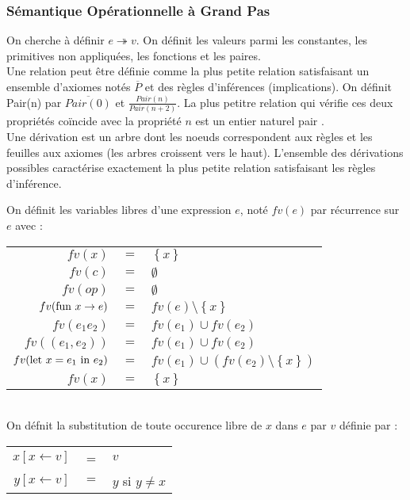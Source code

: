 \documentclass{cours}
\newcommand*{\fun}[2]{\textmd{fun } #1 \rightarrow #2}
\newcommand*{\letin}[1]{\textmd{let } #1 \textmd{ in }}
\begin{document}
\subsubsection{Sémantique Opérationnelle à Grand Pas}
On cherche à définir $e \twoheadrightarrow v$. On définit les valeurs parmi les constantes, les primitives non appliquées, les fonctions et les paires. \\
Une relation peut être définie comme la plus petite relation satisfaisant un ensemble d'axiomes notés $\overline{P}$ et des règles d'inférences (implications). On définit \textmd{Pair(n)} par $\overline{Pair(0)}$ et $\frac{Pair(n)}{Pair(n+2)}$. La plus petitre relation qui vérifie ces deux propriétés coïncide avec la propriété \og $n$ est un entier naturel pair \fg.\\
Une dérivation est un arbre dont les noeuds correspondent aux règles et les feuilles aux axiomes (les arbres croissent vers le haut). L'ensemble des dérivations possibles caractérise exactement la plus petite relation satisfaisant les règles d'inférence. \\
\begin{definition}
    On définit les variables libres d'une expression $e$, noté $fv(e)$ par récurrence sur $e$ avec :
    \begin{tabular}{rcl}
        $fv(x)$ &$=$&$\left\{x\right\}$\\
        $fv(c)$ &$=$&$\emptyset$\\
        $fv(op)$ &$=$&$\emptyset$\\
        $fv(\fun{x}{e})$ &$=$&$fv(e) \setminus \left\{x\right\}$\\
        $fv(e_{1} e_{2})$ &$=$&$fv(e_{1}) \cup fv(e_{2})$\\
        $fv((e_{1}, e_{2}))$ &$=$&$fv(e_{1}) \cup fv(e_{2})$\\
        $fv(\letin{x = e_{1}} e_{2})$ &$=$&$fv(e_{1}) \cup \left(fv(e_{2})\setminus \left\{x\right\}\right)$\\
        $fv(x)$ &$=$&$\left\{x\right\}$\\        
    \end{tabular}\\
    On défnit la substitution  de toute occurence libre de $x$ dans $e$ par $v$ définie par : 
    \begin{tabular}{rcl}
        $x[x\leftarrow v]$ &=& $v$\\
        $y[x \leftarrow v]$ &$=$& $y$ si $y\neq x$
    \end{tabular}
\end{definition}
\end{document}
